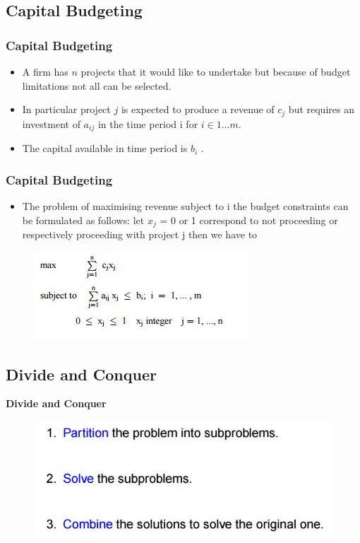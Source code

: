 \documentclass{beamer}
\begin{document}
\subsection{Capital Budgeting}
\begin{frame}
\frametitle{Capital Budgeting}
\Large
\begin{itemize}
\item	A firm has $n$ projects that it would like to undertake but because of budget limitations not all can be
	selected. 
\item In particular project $j$ is expected to produce a revenue of $c_j$ but requires an investment of $a_{ij}$ in the time period i for $i \in 1 \ldots m$. 
\item The capital available in time period  is $b_i$ . 
\end{itemize}
\end{frame}
\begin{frame}
	\frametitle{Capital Budgeting}
	\Large
	\begin{itemize}
		\item The problem of maximising revenue subject to i
	the budget constraints can be formulated as follows: let $x_j$ = 0 or 1 correspond to not proceeding or 	respectively proceeding with project j then we have to
\end{itemize}
\begin{figure}
\centering
\includegraphics[width=0.7\linewidth]{capitalbudgeting}
\end{figure}

\end{frame}
\subsection{Divide and Conquer}
\begin{frame}
\Large
	\noindent \textbf{Divide and Conquer}
	\begin{figure}
\centering
\includegraphics[width=0.7\linewidth]{divideandconquer}
\caption{}
\label{fig:divideandconquer}
\end{figure}

\end{frame}
\end{document}
